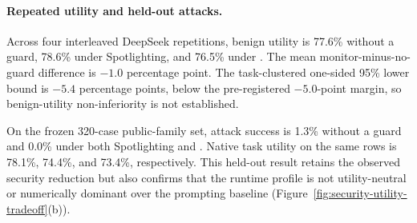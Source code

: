 \paragraph{Repeated utility and held-out attacks.}

Across four interleaved DeepSeek repetitions, benign utility is 77.6\% without
a guard, 78.6\% under Spotlighting, and 76.5\% under \sys{}.  The mean
monitor-minus-no-guard difference is $-1.0$ percentage point.  The
task-clustered one-sided 95\% lower bound is $-5.4$ percentage points, below the
pre-registered $-5.0$-point margin, so benign-utility non-inferiority is not
established.

On the frozen 320-case public-family set, attack success is 1.3\% without a
guard and 0.0\% under both Spotlighting and \sys{}.  Native task utility on the
same rows is 78.1\%, 74.4\%, and 73.4\%, respectively.  This held-out result
retains the observed security reduction but also confirms that the runtime
profile is not utility-neutral or numerically dominant over the prompting
baseline (Figure~\ref{fig:security-utility-tradeoff}(b)).
